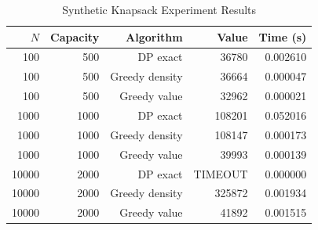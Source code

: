 \begin{table}[htbp]
\caption{Synthetic Knapsack Experiment Results}
\label{tab:synthetic-results}
\centering
\begin{tabular}{rrrrr}
\hline
$N$ & Capacity & Algorithm & Value & Time (s) \\
\hline
100 & 500 & DP exact & 36780 & 0.002610 \\
100 & 500 & Greedy density & 36664 & 0.000047 \\
100 & 500 & Greedy value & 32962 & 0.000021 \\
1000 & 1000 & DP exact & 108201 & 0.052016 \\
1000 & 1000 & Greedy density & 108147 & 0.000173 \\
1000 & 1000 & Greedy value & 39993 & 0.000139 \\
10000 & 2000 & DP exact & TIMEOUT & 0.000000 \\
10000 & 2000 & Greedy density & 325872 & 0.001934 \\
10000 & 2000 & Greedy value & 41892 & 0.001515 \\
\hline
\end{tabular}
\end{table}
